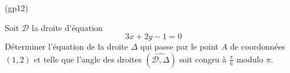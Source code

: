\begin{tiny}(gp12)\end{tiny} Soit $\mathcal{D}$ la droite d'équation
\begin{displaymath}
 3x+2y-1=0
\end{displaymath}
Déterminer l'équation de la droite $\Delta$ qui passe par le point $A$ de coordonnées $(1,2)$ et telle que l'angle des droites 
$(\widehat{\mathcal{D},\Delta})$ soit congru à $\frac{\pi}{6}$ modulo $\pi$.